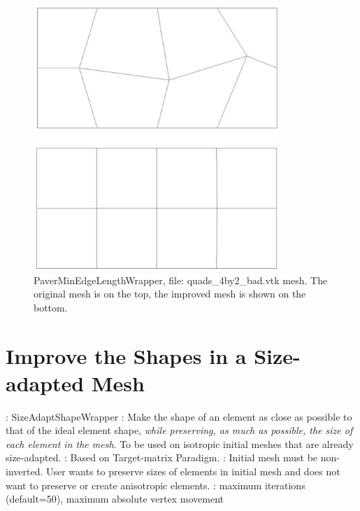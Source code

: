 \begin{figure}[htbp]
\begin{center}
    \includegraphics[height=100mm]{min-edge-length.eps}
    \caption{PaverMinEdgeLengthWrapper, file: quads\_4by2\_bad.vtk mesh. The original mesh is on the top, the improved mesh is shown on the bottom.}
    \label{fig:min_edge-length}
\end{center}
\end{figure}
 
\newpage

\section{Improve the Shapes in a Size-adapted Mesh} \label{sec:SizeAdaptShapeWrapper}

: SizeAdaptShapeWrapper \newline
{}: Make the shape of an element as close as possible to that
of the ideal element shape, {\it while preserving, as much as possible, the size of each element in the mesh}. To be used on isotropic initial meshes that are already size-adapted. \newline
{}: Based on Target-matrix Paradigm. \newline
{}: Initial mesh must be non-inverted. 
User wants to preserve sizes of elements in initial mesh and does not want to preserve or 
create anisotropic elements.  \newline 
{}: maximum iterations (default=50), maximum absolute vertex movement \newline \newline

